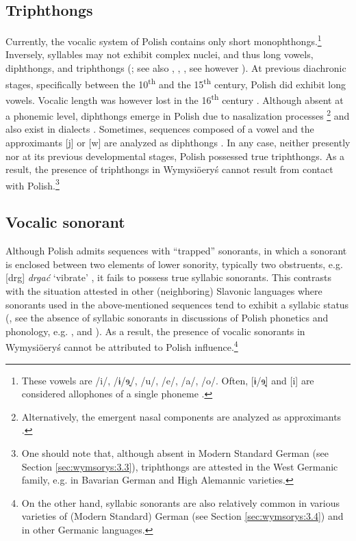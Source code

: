 \documentclass[output=paper,hidelinks]{langscibook}
\begin{document}
\subsection{Triphthongs}\label{sec:wymsorys:4.1}
\largerpage
Currently, the vocalic system of Polish contains only short monophthongs.\footnote{These vowels are /i/, /ɨ/ɘ̟/, /u/, /e/, /a/, /o/. Often, [ɨ/ɘ̟] and [i] are considered allophones of a single phoneme \citep[154, 156]{sussex_slavic_2006}.} Inversely, syllables may not exhibit complex nuclei, and thus long vowels, diphthongs, and triphthongs (\citealt[181]{gussmann_phonology_2007}; see also \cite[59--60, 72, 74]{strutynski_gramatyka_1998}, \citealt[105--106]{jassem_polish_2003}, \citealt[154, 156]{sussex_slavic_2006}, see however \citealt{wagiel_fonematyka_2016}). At previous diachronic stages, specifically between the 10\textsuperscript{th} and the 15\textsuperscript{th} century, Polish did exhibit long vowels. Vocalic length was however lost in the 16\textsuperscript{th} century \citep[132, 136--137]{dlugosz-kurczabowa_gramatyka_2006}. Although absent at a phonemic level, diphthongs emerge in Polish due to nasalization processes \citep[53, 62--64, 83]{wagiel_fonematyka_2016}\footnote{Alternatively, the emergent nasal components are analyzed as approximants \citep{gussmann_phonology_2007}.} and also exist in dialects \citep{dejna_dialekty_1973, bak_gramatyka_1997}. Sometimes, sequences composed of a vowel and the approximants [j] or [w] are analyzed as diphthongs \citep[81--83]{jassem_podstawy_1973, demenko_analiza_1999, wagiel_fonematyka_2016}. In any case, neither presently nor at its previous developmental stages, Polish possessed true triphthongs. As a result, the presence of triphthongs in Wymysiöeryś cannot result from contact with Polish.\footnote{One should note that, although absent in Modern Standard German (see Section \ref{sec:wymsorys:3.3}), triphthongs are attested in the West Germanic family, e.g. in Bavarian German and High Alemannic varieties.}

\subsection{Vocalic sonorant}\label{sec:wymsorys:4.2}


Although Polish admits sequences with ``trapped'' sonorants, in which a sonorant is enclosed between two elements of lower sonority, typically two obstruents, e.g. [drg] \textit{drgać} `vibrate' \citep[62, 66]{kijak_polish_2008}, it fails to possess true syllabic sonorants. This contrasts with the situation attested in other (neighboring) Slavonic languages where sonorants used in the above-mentioned sequences tend to exhibit a syllabic status (\citealt[66]{sussex_slavic_2006, kijak_polish_2008}, see the absence of syllabic sonorants in discussions of Polish phonetics and phonology, e.g. \citealt{strutynski_gramatyka_1998, jassem_polish_2003, gussmann_phonology_2007}, and \citealt{wagiel_fonematyka_2016}). As a result, the presence of vocalic sonorants in Wymysiöeryś cannot be attributed to Polish influence.\footnote{On the other hand, syllabic sonorants are also relatively common in various varieties of (Modern Standard) German (see Section \ref{sec:wymsorys:3.4}) and in other Germanic languages.}
\end{document}

